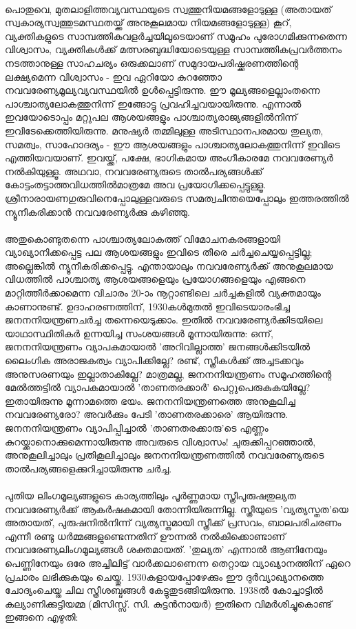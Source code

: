 \paragraph{}പൊതുവെ, മുതലാളിത്തവ്യവസ്ഥയുടെ സ്വത്തുനിയമങ്ങളോടുള്ള (അതായത് സ്വകാര്യസ്വത്തുടമസ്ഥതയ്ക്ക് അനുകൂലമായ നിയമങ്ങളോടുള്ള) കൂറ്, വ്യക്തികളുടെ സാമ്പത്തികവളർച്ചയിലൂടെയാണ് സമൂഹം പുരോഗമിക്കുന്നതെന്ന വിശ്വാസം, വ്യക്തികൾക്ക് മത്സരബുദ്ധിയോടെയുള്ള സാമ്പത്തികപ്രവർത്തനം നടത്താനുള്ള സാഹചര്യം ഒരുക്കലാണ് സമുദായപരിഷ്ക്കരണത്തിന്റെ ലക്ഷ്യമെന്ന വിശ്വാസം - ഇവ ഏറിയോ കുറഞ്ഞോ നവവരേണ്യമൂല്യവ്യവസ്ഥയിൽ ഉൾപ്പെട്ടിരുന്നു. ഈ മൂല്യങ്ങളെല്ലാംതന്നെ പാശ്ചാത്യലോകത്തുനിന്ന് ഇങ്ങോട്ടു പ്രവഹിച്ചവയായിരുന്നു. എന്നാൽ ഇവയോടൊപ്പം മറ്റുപല ആശയങ്ങളും പാശ്ചാത്യരാജ്യങ്ങളിൽനിന്ന് ഇവിടേക്കെത്തിയിരുന്നു. മനുഷ്യർ തമ്മിലുള്ള അടിസ്ഥാനപരമായ തുല്യത, സമത്വം, സാഹോദര്യം - ഈ ആശയങ്ങളും പാശ്ചാത്യലോകത്തുനിന്ന് ഇവിടെ എത്തിയവയാണ്. ഇവയ്ക്ക്, പക്ഷേ, ഭാഗികമായ അംഗീകാരമേ നവവരേണ്യർ നൽകിയുള്ളൂ. അഥവാ, നവവരേണ്യരുടെ താൽപര്യങ്ങൾക്ക് കോട്ടംതട്ടാത്തവിധത്തിൽമാത്രമേ അവ പ്രയോഗിക്കപ്പെട്ടുള്ളൂ. ശ്രീനാരായണഗുരുവിനെപ്പോലുള്ളവരുടെ സമത്വചിന്തയെപ്പോലും ഇത്തരത്തിൽ ന്യൂനീകരിക്കാൻ നവവരേണ്യർക്കു കഴിഞ്ഞു.

\paragraph{}
അതുകൊണ്ടുതന്നെ പാശ്ചാത്യലോകത്ത് വിമോചനകരങ്ങളായി വ്യാഖ്യാനിക്കപ്പെട്ട പല ആശയങ്ങളും ഇവിടെ തീരെ ചർച്ചചെയ്യപ്പെട്ടില്ല; അല്ലെങ്കിൽ ന്യൂനീകരിക്കപ്പെട്ടു. എന്തായാലും നവവരേണ്യർക്ക് അനുകൂലമായ വിധത്തിൽ പാശ്ചാത്യ ആശയങ്ങളെയും പ്രയോഗങ്ങളെയും എങ്ങനെ മാറ്റിത്തീർക്കാമെന്ന വിചാരം 20-ാം നൂറ്റാണ്ടിലെ ചർച്ചകളിൽ വ്യക്തമായും കാണാനുണ്ട്. ഉദാഹരണത്തിന്, 1930കൾമുതൽ ഇവിടെയാരംഭിച്ച ജനനനിയന്ത്രണചർച്ച തന്നെയെടുക്കാം. ഇതിൽ നവവരേണ്യർക്കിടയിലെ യാഥാസ്ഥിതികർ ഉന്നയിച്ച സംശയങ്ങൾ മൂന്നായിരുന്നു: ഒന്ന്, ജനനനിയന്ത്രണം വ്യാപകമായാൽ 'അറിവില്ലാത്ത' ജനങ്ങൾക്കിടയിൽ ലൈംഗിക അരാജകത്വം വ്യാപിക്കില്ലേ? രണ്ട്, സ്ത്രീകൾക്ക് അച്ചടക്കവും അനുസരണയും ഇല്ലാതാകില്ലേ? മാത്രമല്ല, ജനനനിയന്ത്രണം സമൂഹത്തിന്റെ മേൽത്തട്ടിൽ വ്യാപകമായാൽ 'താണതരക്കാർ' പെറ്റുപെരുകുകയില്ലേ? ഇതായിരുന്നു മൂന്നാമത്തെ ഭയം. ജനനനിയന്ത്രണത്തെ അനുകൂലിച്ച നവവരേണ്യരോ? അവർക്കും പേടി 'താണതരക്കാരെ' ആയിരുന്നു. ജനനനിയന്ത്രണം വ്യാപിപ്പിച്ചാൽ 'താണതരക്കാരു'ടെ എണ്ണം കുറയ്ക്കാനൊക്കുമെന്നായിരുന്നു അവരുടെ വിശ്വാസം! ചുരുക്കിപ്പറഞ്ഞാൽ, അനുകൂലിച്ചാലും പ്രതികൂലിച്ചാലും ജനനനിയന്ത്രണത്തിൽ നവവരേണ്യരുടെ താൽപര്യങ്ങളെക്കുറിച്ചായിരുന്നു ചർച്ച.

\paragraph{}പുതിയ ലിംഗമൂല്യങ്ങളുടെ കാര്യത്തിലും പൂർണ്ണമായ സ്ത്രീപുരുഷതുല്യത നവവരേണ്യർക്ക് ആകർഷകമായി തോന്നിയിരുന്നില്ല. സ്ത്രീയുടെ 'വ്യത്യസ്തത'യെ അതായത്, പുരുഷനിൽനിന്ന് വ്യത്യസ്തമായി സ്ത്രീക്ക് പ്രസവം, ബാലപരിചരണം എന്നീ രണ്ടു ധർമ്മങ്ങളുണ്ടെന്നതിന് ഊന്നൽ നൽകിക്കൊണ്ടാണ് നവവരേണ്യലിംഗമൂല്യങ്ങൾ ശക്തമായത്. 'തുല്യത' എന്നാൽ ആണിനേയും പെണ്ണിനേയും ഒരേ അച്ചിലിട്ട് വാർക്കലാണെന്ന തെറ്റായ വ്യാഖ്യാനത്തിന് ഏറെ പ്രചാരം ലഭിക്കുകയും ചെയ്തു. 1930കളായപ്പോഴേക്കും ഈ ദുർവ്യാഖ്യാനത്തെ ചോദ്യംചെയ്ത ചില സ്ത്രീശബ്ദങ്ങൾ കേട്ടുതുടങ്ങിയിരുന്നു. 1938ൽ കോച്ചാട്ടിൽ കല്യാണിക്കുട്ടിയമ്മ (മിസിസ്സ്. സി. കുട്ടൻനായർ) ഇതിനെ വിമർശിച്ചുകൊണ്ട് ഇങ്ങനെ എഴുതി:

